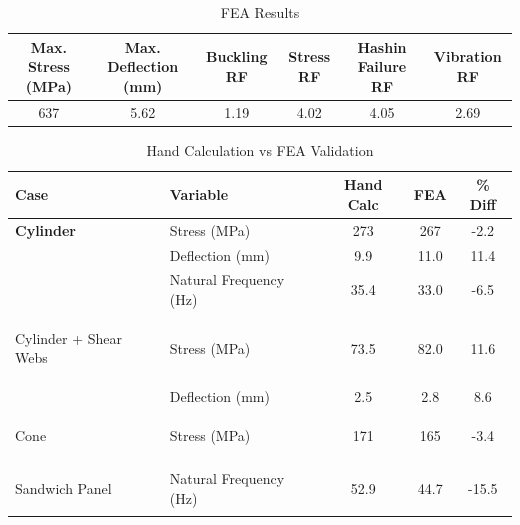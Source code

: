 \documentclass[a4paper, 11pt, conference]{IEEEtran}
\begin{document}
\begin{table}[h!]
\centering
\caption{FEA Results}
\label{tab:fea_results}
\begin{tabular}{cccccc}
\toprule
Max. Stress (MPa) & Max. Deflection (mm) & Buckling RF & Stress RF & Hashin Failure RF & Vibration RF \\
\midrule
637 & 5.62 & 1.19 & 4.02 & 4.05 & 2.69 \\
\bottomrule
\end{tabular}
\end{table}


\begin{table}[H]
\centering
\caption{Hand Calculation vs FEA Validation}
\label{tab:validation_final}
\begin{tabular}{@{}>{\bfseries}l l c c c@{}}
\toprule
\textbf{Case} & \textbf{Variable} & \textbf{Hand Calc} & \textbf{FEA} & \textbf{\% Diff} \\
\midrule
Cylinder & Stress (MPa) & 273 & 267 & -2.2 \\
         & Deflection (mm) & 9.9 & 11.0 & 11.4 \\
         & Natural Frequency (Hz) & 35.4 & 33.0 & -6.5 \\
\midrule

Cylinder + Shear Webs & Stress (MPa) & 73.5 & 82.0 & 11.6 \\
                      & Deflection (mm) & 2.5 & 2.8 & 8.6 \\
\midrule

Cone & Stress (MPa) & 171 & 165 & -3.4 \\
\midrule

Sandwich Panel & Natural Frequency (Hz) & 52.9 & 44.7 & -15.5 \\
\bottomrule
\end{tabular}
\end{table}
\end{document}
